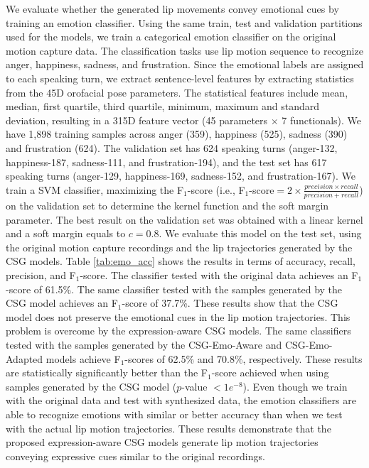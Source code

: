 \documentclass[10pt,journal,compsoc]{IEEEtran}
\begin{document}
We evaluate whether the generated lip movements convey emotional cues by training an emotion classifier. Using the same train, test and validation partitions used for the models, we train  a categorical emotion classifier on the original motion capture data. The classification tasks use lip motion sequence to recognize anger, happiness, sadness, and frustration. Since the emotional labels are assigned to each speaking turn, we extract sentence-level features by extracting statistics from the 45D orofacial pose parameters. The statistical features include mean, median, first quartile, third quartile, minimum, maximum and standard deviation, resulting in a 315D feature vector (45 parameters $\times$ 7 functionals).  We have 1,898 training samples across anger (359), happiness (525), sadness (390) and frustration (624). The validation set has 624 speaking turns (anger-132, happiness-187, sadness-111, and frustration-194), and the test set has 617 speaking turns (anger-129, happiness-169, sadness-152, and frustration-167). We train a SVM classifier, maximizing the F$_1$-score (i.e., F$_1$-score$=2\times\frac{precision\times recall}{precision+recall}$) on the validation set to determine the kernel function and the soft margin parameter. The best result on the validation set was obtained with a linear kernel and a soft margin equals to $c=0.8$. We evaluate this model on the test set, using the original motion capture recordings and the lip trajectories generated by the CSG models. Table \ref{tab:emo_acc} shows the results in terms of accuracy, recall, precision, and F$_1$-score. The classifier tested with the original data achieves an F$_1$-score of 61.5\%. The same classifier tested with the samples generated by the CSG model achieves an F$_1$-score of 37.7\%. These results show that the CSG model does not preserve the emotional cues in the lip motion trajectories. This problem is overcome by the expression-aware CSG models. The same classifiers tested with the samples generated by the CSG-Emo-Aware and CSG-Emo-Adapted models achieve F$_1$-scores of 62.5\% and 70.8\%, respectively. These results are statistically significantly better than the F$_1$-score achieved when using samples generated by the CSG model ($p$-value $<1e^{-8}$).  Even though we train with the original data and test with synthesized data, the emotion classifiers are able to recognize emotions with similar or better accuracy than when we test with the actual lip motion trajectories. These results demonstrate that the proposed expression-aware CSG models generate lip motion trajectories conveying expressive cues similar to the original recordings.
\end{document}
